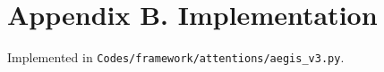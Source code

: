 \section*{Appendix B. Implementation}Implemented in \texttt{Codes/framework/attentions/aegis\_v3.py}.
